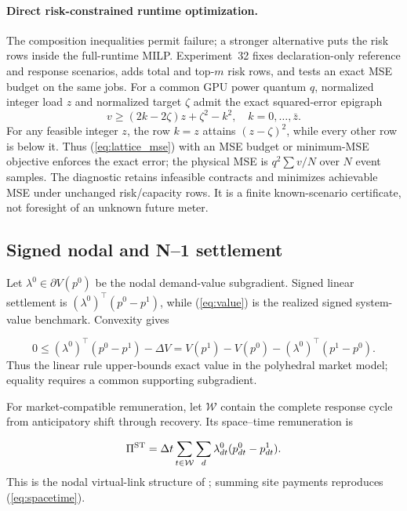 \documentclass[10pt,journal]{IEEEtran}
\newcommand{\dt}{\Delta t}
\begin{document}
\paragraph{Direct risk-constrained runtime optimization.}
The composition inequalities permit failure; a stronger alternative puts the
risk rows inside the full-runtime MILP. Experiment~32 fixes declaration-only
reference and response scenarios, adds total and top-$m$ risk rows, and tests
an exact MSE budget on the same jobs. For a common GPU power quantum $q$, normalized integer load $z$ and
normalized target $\zeta$ admit the exact squared-error epigraph
\begin{equation}
 v\geq(2k-2\zeta)z+\zeta^2-k^2,\quad k=0,\ldots,\bar z.
 \label{eq:lattice_mse}
\end{equation}
For any feasible integer $z$, the row $k=z$ attains $(z-\zeta)^2$, while every
other row is below it. Thus (\ref{eq:lattice_mse}) with an MSE budget or
minimum-MSE objective enforces the exact error; the physical MSE is
$q^2\sum v/N$ over $N$ event samples.
The diagnostic retains infeasible contracts and minimizes achievable MSE
under unchanged risk/capacity rows. It is a finite known-scenario certificate,
not foresight of an unknown future meter.

\subsection{Signed nodal and N--1 settlement}

Let $\lambda^0\in\partial V(p^0)$ be the nodal demand-value subgradient.
Signed linear settlement is $({\lambda^0})^\top(p^0-p^1)$, while
(\ref{eq:value}) is the realized signed system-value benchmark. Convexity
\cite{boyd2004convex} gives

\begin{equation}
 0\leq(\lambda^0)^\top(p^0-p^1)-\Delta V
 =V(p^1)-V(p^0)-(\lambda^0)^\top(p^1-p^0).
 \label{eq:bregman}
\end{equation}
Thus the linear rule upper-bounds exact value in the polyhedral market model;
equality requires a common supporting subgradient.

For market-compatible remuneration, let $\mathcal W$ contain the complete response cycle from anticipatory shift
through recovery. Its space--time remuneration is

\begin{equation}
 \Pi^{\rm ST}=\dt\sum_{t\in\mathcal W}\sum_d
 \lambda^0_{dt}(p^0_{dt}-p^1_{dt}).
 \label{eq:spacetime}
\end{equation}
This is the nodal virtual-link structure of
\cite{zhang2020virtuallinks,zhang2022remunerating}; summing site payments
reproduces (\ref{eq:spacetime}).
\end{document}
